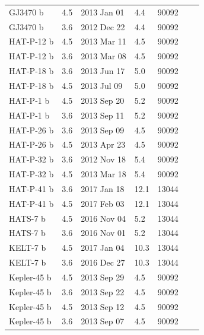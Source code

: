 \begin{longtable}[h]{lllllll}
GJ3470 b    &               4.5 &   2013 Jan 01 &         4.4 &       90092 \\
GJ3470 b    &               3.6 &   2012 Dec 22 &         4.4 &       90092 \\
HAT-P-12 b  &               4.5 &   2013 Mar 11 &         4.5 &       90092 \\
HAT-P-12 b  &               3.6 &   2013 Mar 08 &         4.5 &       90092 \\
HAT-P-18 b  &               3.6 &   2013 Jun 17 &         5.0 &       90092 \\
HAT-P-18 b  &               4.5 &   2013 Jul 09 &         5.0 &       90092 \\
HAT-P-1 b   &               4.5 &   2013 Sep 20 &         5.2 &       90092 \\
HAT-P-1 b   &               3.6 &   2013 Sep 11 &         5.2 &       90092 \\
HAT-P-26 b  &               3.6 &   2013 Sep 09 &         4.5 &       90092 \\
HAT-P-26 b  &               4.5 &   2013 Apr 23 &         4.5 &       90092 \\
HAT-P-32 b   &               3.6 &   2012 Nov 18 &         5.4 &       90092 \\
HAT-P-32 b  &               4.5 &   2013 Mar 18 &         5.4 &       90092 \\
HAT-P-41 b   &               3.6 &   2017 Jan 18 &        12.1 &       13044 \\
HAT-P-41 b   &               4.5 &   2017 Feb 03 &        12.1 &       13044 \\
HATS-7 b     &               4.5 &   2016 Nov 04 &         5.2 &       13044 \\
HATS-7 b     &               3.6 &   2016 Nov 01 &         5.2 &       13044 \\
KELT-7 b     &               4.5 &   2017 Jan 04 &        10.3 &       13044 \\
KELT-7 b     &               3.6 &   2016 Dec 27 &        10.3 &       13044 \\
Kepler-45 b &               4.5 &   2013 Sep 29 &         4.5 &       90092 \\
Kepler-45 b &               3.6 &   2013 Sep 22 &         4.5 &       90092 \\
Kepler-45 b &               4.5 &   2013 Sep 12 &         4.5 &       90092 \\
Kepler-45 b &               3.6 &   2013 Sep 07 &         4.5 &       90092 \\

\end{longtable}
